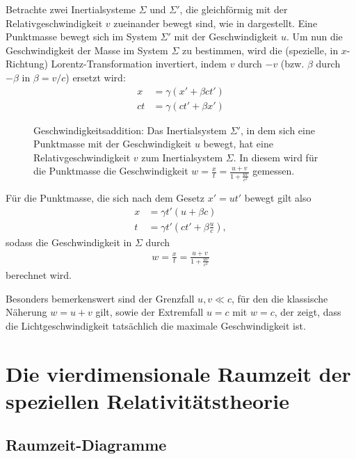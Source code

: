 Betrachte zwei Inertialsysteme $\Sigma$ und $\Sigma'$, die gleichförmig mit der Relativgeschwindigkeit  $v$ zueinander bewegt sind, wie in  dargestellt.
Eine Punktmasse bewegt sich im System $\Sigma'$ mit der Geschwindigkeit $u$.
Um nun die Geschwindigkeit der Masse im System $\Sigma$ zu bestimmen, wird die (spezielle, in $x$-Richtung) Lorentz-Transformation invertiert, indem $v$ durch $-v$ (bzw. $\beta$ durch $-\beta$ in $\beta=v/c$) ersetzt wird:
\begin{align*}
    x  & =\gamma(x'+\beta ct') \\
    ct & =\gamma(ct'+\beta x')
\end{align*}
\begin{figure}[htp]
    \centering
    \tfigGeschwindigkeitsaddition
    \caption{Geschwindigkeitsaddition: Das Inertialsystem $\Sigma'$, in dem sich eine Punktmasse mit der Geschwindigkeit $u$ bewegt, hat eine Relativgeschwindigkeit $v$ zum Inertialsystem $\Sigma$. In diesem wird für die Punktmasse die Geschwindigkeit $w=\frac{x}{t}=\frac{u+v}{1+\frac{uv}{c^2}}$ gemessen. }
    \label{fig:Geschwindigkeitsaddition}
\end{figure}

Für die Punktmasse, die sich nach dem Gesetz $x'=ut'$ bewegt gilt also
\begin{align*}
    x & =\gamma t'(u+\beta c)              \\
    t & =\gamma t'(ct'+\beta \frac{u}{c}),
\end{align*}
sodass die Geschwindigkeit in $\Sigma$ durch
\begin{align*}
    w=\frac{x}{t}=\frac{u+v}{1+\frac{uv}{c^2}}
\end{align*}
berechnet wird.

Besonders bemerkenswert sind der Grenzfall $u,v\ll c$, für den die klassische Näherung $w=u+v$ gilt, sowie der Extremfall $u=c$ mit $w=c$, der zeigt, dass die Lichtgeschwindigkeit tatsächlich die maximale Geschwindigkeit ist.




\section{Die vierdimensionale Raumzeit der speziellen Relativitätstheorie}

\subsection{Raumzeit-Diagramme}

